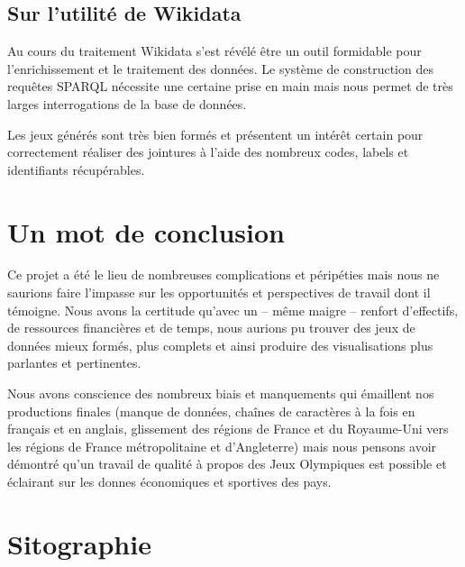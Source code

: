 \documentclass[hidelinks, 12pt]{report}
\begin{document}
\section{Sur l'utilité de Wikidata}

Au cours du traitement Wikidata s'est révélé être un outil formidable pour l'enrichissement et le traitement des données. Le système de construction des requêtes SPARQL nécessite une certaine prise en main mais nous permet de très larges interrogations de la base de données.

Les jeux générés sont très bien formés et présentent un intérêt certain pour correctement réaliser des jointures à l'aide des nombreux codes, labels et identifiants récupérables.





%





\chapter{Un mot de conclusion}

Ce projet a été le lieu de nombreuses complications et péripéties mais nous ne saurions faire l'impasse sur les opportunités et perspectives de travail dont il témoigne. Nous avons la certitude qu'avec un -- même maigre -- renfort d'effectifs, de ressources financières et de temps, nous aurions pu trouver des jeux de données mieux formés, plus complets et ainsi produire des visualisations plus parlantes et pertinentes.

Nous avons conscience des nombreux biais et manquements qui émaillent nos productions finales (manque de données, chaînes de caractères à la fois en français et en anglais, glissement des régions de France et du Royaume-Uni vers les régions de France métropolitaine et d'Angleterre) mais nous pensons avoir démontré qu'un travail de qualité à propos des Jeux Olympiques est possible et éclairant sur les donnes économiques et sportives des pays.





%





\chapter{Sitographie}
\printbibliography[heading=none]
\newpage

\end{document}
